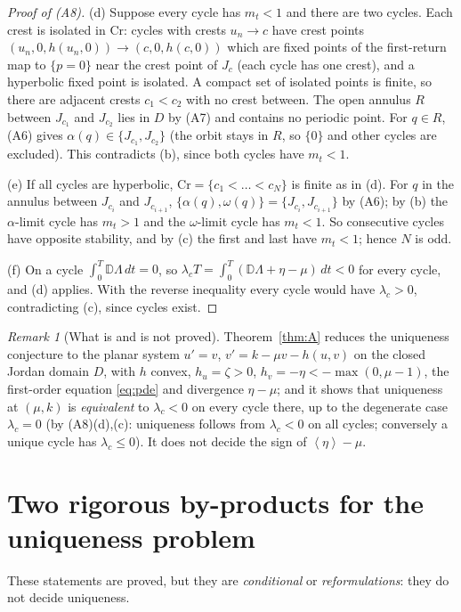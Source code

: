 \documentclass[11pt,a4paper]{article}
\numberwithin{equation}{section}
\theoremstyle{remark}\newtheorem{remark}[theorem]{Remark}
\newcommand{\avg}[1]{\left\langle #1\right\rangle}
\begin{document}
\begin{proof}[Proof of (A8)]
(d) Suppose every cycle has $m_t<1$ and there are two cycles. Each crest is isolated in $\mathrm{Cr}$: cycles with
crests $u_n\to c$ have crest points $(u_n,0,h(u_n,0))\to(c,0,h(c,0))$ which are fixed points of the first-return map
to $\{p=0\}$ near the crest point of $J_c$ (each cycle has one crest), and a hyperbolic fixed point is isolated. A
compact set of isolated points is finite, so there are adjacent crests $c_1<c_2$ with no crest between. The open
annulus $R$ between $J_{c_1}$ and $J_{c_2}$ lies in $D$ by (A7) and contains no periodic point. For $q\in R$, (A6)
gives $\alpha(q)\in\{J_{c_1},J_{c_2}\}$ (the orbit stays in $R$, so $\{0\}$ and other cycles are excluded). This
contradicts (b), since both cycles have $m_t<1$.

(e) If all cycles are hyperbolic, $\mathrm{Cr}=\{c_1<\dots<c_N\}$ is finite as in (d). For $q$ in the annulus
between $J_{c_i}$ and $J_{c_{i+1}}$, $\{\alpha(q),\omega(q)\}=\{J_{c_i},J_{c_{i+1}}\}$ by (A6); by (b) the
$\alpha$-limit cycle has $m_t>1$ and the $\omega$-limit cycle has $m_t<1$. So consecutive cycles have opposite
stability, and by (c) the first and last have $m_t<1$; hence $N$ is odd.

(f) On a cycle $\int_0^T\mathbb D\Lambda\,dt=0$, so $\lambda_cT=\int_0^T(\mathbb D\Lambda+\eta-\mu)\,dt<0$ for every
cycle, and (d) applies. With the reverse inequality every cycle would have $\lambda_c>0$, contradicting (c), since
cycles exist.
\end{proof}

\begin{remark}[What is and is not proved]
Theorem~\ref{thm:A} reduces the uniqueness conjecture to the planar system $u'=v$, $v'=k-\mu v-h(u,v)$ on the
closed Jordan domain $D$, with $h$ convex, $h_u=\zeta>0$, $h_v=-\eta<-\max(0,\mu-1)$, the first-order equation
\eqref{eq:pde} and divergence $\eta-\mu$; and it shows that uniqueness at $(\mu,k)$ is \emph{equivalent} to
$\lambda_c<0$ on every cycle there, up to the degenerate case $\lambda_c=0$ (by (A8)(d),(c): uniqueness follows
from $\lambda_c<0$ on all cycles; conversely a unique cycle has $\lambda_c\le0$). It does not decide the sign of
$\avg\eta-\mu$.
\end{remark}

\section{Two rigorous by-products for the uniqueness problem}\label{sec:byproducts}
These statements are proved, but they are \emph{conditional} or \emph{reformulations}: they do not decide uniqueness.
\end{document}
